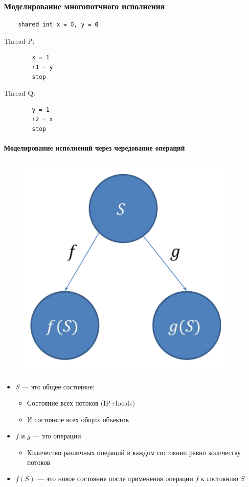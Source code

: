 \documentclass[10pt,a4paper,oneside,titlepage]{article}
\begin{document}
\subsubsection{Моделирование многопотчного исполнения}

\begin{center}
	\begin{lstlisting}
	shared int x = 0, y = 0
	\end{lstlisting}
\end{center}
	
	\begin{minipage}{0.4\textwidth}
		Thread P:
		
		\begin{lstlisting}
		x = 1
		r1 = y
		stop
		\end{lstlisting}
	\end{minipage}
	\hfill
	\begin{minipage}{0.4\textwidth}
		Thread Q:
		
		\begin{lstlisting}
		y = 1
		r2 = x
		stop
		\end{lstlisting}
	\end{minipage}

\paragraph{Моделирование исполнений через чередование операций}

\begin{figure}[h!]
	\centering
	\includegraphics[width=0.3\linewidth]{pictures/Model}
	\caption{}
	\label{fig:model}
\end{figure}

\begin{itemize}
	\item $S$ --- это общее состояние:
	\begin{itemize}
		\item Состояние всех потоков (IP+locals)
		\item И состояние всех общих объектов
	\end{itemize}
    \item $f$ и $g$ --- это операции
    \begin{itemize}
    	\item Количество различных операций в каждом состоянии равно количеству потоков
    \end{itemize}
    \item $f(S)$ --- это новое состояние после применения операции $f$ к состоянию $S$ 
\end{itemize}
\end{document}
